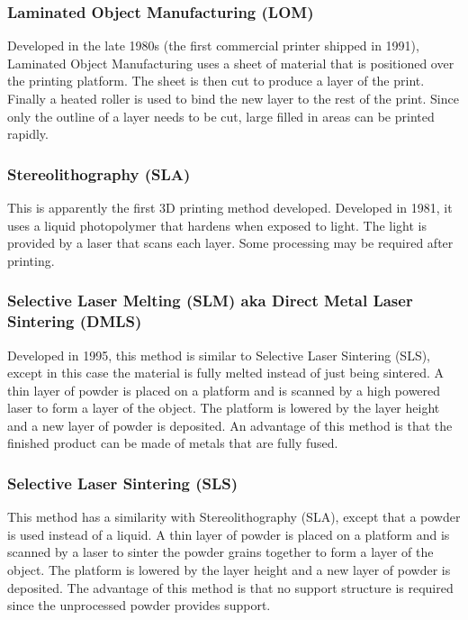 \documentclass[english,10pt]{beamer}
\begin{document}
\begin{frame}
  \frametitle{Laminated Object Manufacturing (LOM)}
  Developed in the late 1980s (the first commercial printer shipped in 1991), Laminated Object Manufacturing uses a sheet of material that is positioned over the printing platform.  The sheet is then cut to produce a layer of the print.  Finally a heated roller is used to bind the new layer to the rest of the print.  Since only the outline of a layer needs to be cut, large filled in areas can be printed rapidly.
\end{frame}

\begin{frame}
  \frametitle{Stereolithography (SLA)}
  This is apparently the first 3D printing method developed.  Developed in 1981, it uses a liquid photopolymer that hardens when exposed to light.  The light is provided by a laser that scans each layer.  Some processing may be required after printing.
\end{frame}

\begin{frame}
  \frametitle{Selective Laser Melting (SLM) aka Direct Metal Laser Sintering (DMLS)}
  Developed in 1995, this method is similar to Selective Laser Sintering (SLS), except in this case the material is fully melted instead of just being sintered.    A thin layer of powder is placed on a platform and is scanned by a high powered laser to form a layer of the object.  The platform is lowered by the layer height and a new layer of powder is deposited.  An advantage of this method is that the finished product can be made of metals that are fully fused.
\end{frame}

\begin{frame}
  \frametitle{Selective Laser Sintering (SLS)}
  This method has a similarity with Stereolithography (SLA), except that a powder is used instead of a liquid.  A thin layer of powder is placed on a platform and is scanned by a laser to sinter the powder grains together to form a layer of the object.  The platform is lowered by the layer height and a new layer of powder is deposited.  The advantage of this method is that no support structure is required since the unprocessed powder provides support.
\end{frame}
\end{document}
